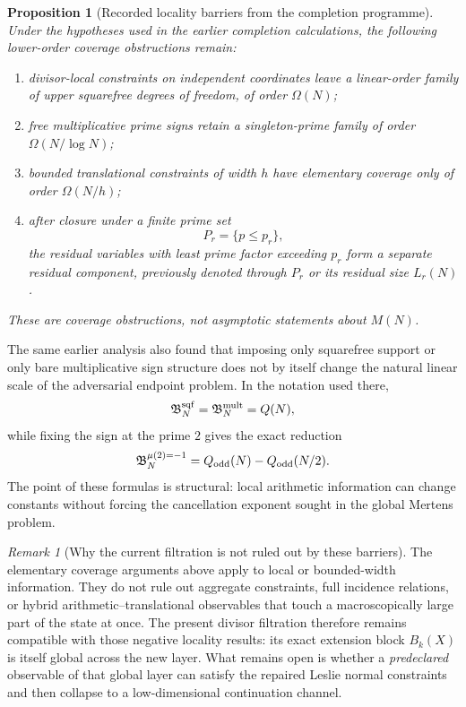 \documentclass[11pt]{amsart}
\numberwithin{equation}{section}
\theoremstyle{plain}
\newtheorem{proposition}[theorem]{Proposition}
\theoremstyle{definition}
\theoremstyle{remark}
\newtheorem{remark}[theorem]{Remark}
\begin{document}
\begin{proposition}[Recorded locality barriers from the completion programme]
\label{prop:v9_recorded_locality_barriers}
Under the hypotheses used in the earlier completion calculations, the following lower-order
coverage obstructions remain:
\begin{enumerate}
\item divisor-local constraints on independent coordinates leave a linear-order family of
upper squarefree degrees of freedom, of order $\Omega(N)$;
\item free multiplicative prime signs retain a singleton-prime family of order
$\Omega(N/\log N)$;
\item bounded translational constraints of width $h$ have elementary coverage only of order
$\Omega(N/h)$;
\item after closure under a finite prime set
\[
P_r=\{p\le p_r\},
\]
the residual variables with least prime factor exceeding $p_r$ form a separate residual
component, previously denoted through $P_r$ or its residual size $L_r(N)$.
\end{enumerate}
These are coverage obstructions, not asymptotic statements about $M(N)$.
\end{proposition}

The same earlier analysis also found that imposing only squarefree support or only bare
multiplicative sign structure does not by itself change the natural linear scale of the
adversarial endpoint problem.  In the notation used there,
\begin{equation}
\mathfrak B_N^{\rm sqf}
=
\mathfrak B_N^{\rm mult}
=
Q(N),
\label{eq:v9_sqf_mult_envelope}
\end{equation}
while fixing the sign at the prime $2$ gives the exact reduction
\begin{equation}
\mathfrak B_N^{\mu(2)=-1}
=
Q_{\rm odd}(N)-Q_{\rm odd}(N/2).
\label{eq:v9_fixed_two_envelope}
\end{equation}
The point of these formulas is structural: local arithmetic information can change constants
without forcing the cancellation exponent sought in the global Mertens problem.

\begin{remark}[Why the current filtration is not ruled out by these barriers]
\label{rem:v9_global_hybrid_escape}
The elementary coverage arguments above apply to local or bounded-width information.  They do
not rule out aggregate constraints, full incidence relations, or hybrid arithmetic--translational
observables that touch a macroscopically large part of the state at once.  The present divisor
filtration therefore remains compatible with those negative locality results: its exact extension
block $B_k(X)$ is itself global across the new layer.  What remains open is whether a
\emph{predeclared} observable of that global layer can satisfy the repaired Leslie normal
constraints and then collapse to a low-dimensional continuation channel.
\end{remark}
\end{document}
